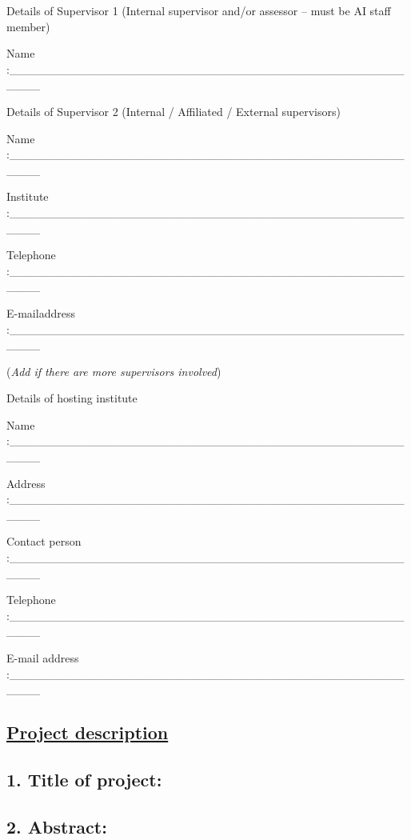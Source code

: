 \documentclass[
]{article}
\begin{document}
Details of Supervisor 1 (Internal supervisor and/or assessor -- must be
AI staff member)

Name
:\_\_\_\_\_\_\_\_\_\_\_\_\_\_\_\_\_\_\_\_\_\_\_\_\_\_\_\_\_\_\_\_\_\_\_\_\_\_\_\_\_\_\_\_\_\_\_\_\_\_\_

Details of Supervisor 2 (Internal / Affiliated / External supervisors)

Name
:\_\_\_\_\_\_\_\_\_\_\_\_\_\_\_\_\_\_\_\_\_\_\_\_\_\_\_\_\_\_\_\_\_\_\_\_\_\_\_\_\_\_\_\_\_\_\_\_\_\_\_

Institute
:\_\_\_\_\_\_\_\_\_\_\_\_\_\_\_\_\_\_\_\_\_\_\_\_\_\_\_\_\_\_\_\_\_\_\_\_\_\_\_\_\_\_\_\_\_\_\_\_\_\_\_

Telephone
:\_\_\_\_\_\_\_\_\_\_\_\_\_\_\_\_\_\_\_\_\_\_\_\_\_\_\_\_\_\_\_\_\_\_\_\_\_\_\_\_\_\_\_\_\_\_\_\_\_\_\_

E-mailaddress
:\_\_\_\_\_\_\_\_\_\_\_\_\_\_\_\_\_\_\_\_\_\_\_\_\_\_\_\_\_\_\_\_\_\_\_\_\_\_\_\_\_\_\_\_\_\_\_\_\_\_\_

(\emph{Add if there are more supervisors involved})

Details of hosting institute

Name
:\_\_\_\_\_\_\_\_\_\_\_\_\_\_\_\_\_\_\_\_\_\_\_\_\_\_\_\_\_\_\_\_\_\_\_\_\_\_\_\_\_\_\_\_\_\_\_\_\_\_\_

Address
:\_\_\_\_\_\_\_\_\_\_\_\_\_\_\_\_\_\_\_\_\_\_\_\_\_\_\_\_\_\_\_\_\_\_\_\_\_\_\_\_\_\_\_\_\_\_\_\_\_\_\_

Contact person
:\_\_\_\_\_\_\_\_\_\_\_\_\_\_\_\_\_\_\_\_\_\_\_\_\_\_\_\_\_\_\_\_\_\_\_\_\_\_\_\_\_\_\_\_\_\_\_\_\_\_\_

Telephone
:\_\_\_\_\_\_\_\_\_\_\_\_\_\_\_\_\_\_\_\_\_\_\_\_\_\_\_\_\_\_\_\_\_\_\_\_\_\_\_\_\_\_\_\_\_\_\_\_\_\_\_

E-mail address
:\_\_\_\_\_\_\_\_\_\_\_\_\_\_\_\_\_\_\_\_\_\_\_\_\_\_\_\_\_\_\_\_\_\_\_\_\_\_\_\_\_\_\_\_\_\_\_\_\_\_\_

\hypertarget{project-description}{%
\subsection{\texorpdfstring{\ul{Project
description}}{Project description}}\label{project-description}}

\hypertarget{title-of-project}{%
\subsection{1. Title of project:}\label{title-of-project}}

\hypertarget{abstract}{%
\subsection{\texorpdfstring{2. Abstract:
}{2. Abstract: }}\label{abstract}}
\end{document}
